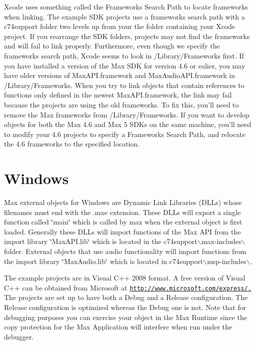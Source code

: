 Xcode uses something called the Frameworks Search Path to locate frameworks when linking. The example SDK projects use a frameworks search path with a c74support folder two levels up from your the folder containing your Xcode project. If you rearrange the SDK folders, projects may not find the frameworks and will fail to link properly. Furthermore, even though we specify the frameworks search path, Xcode seems to look in /Library/Frameworks first. If you have installed a version of the Max SDK for version 4.6 or ealier, you may have older versions of MaxAPI.framework and MaxAudioAPI.framework in /Library/Frameworks. When you try to link objects that contain references to functions only defined in the newest MaxAPI.framework, the link may fail because the projects are using the old frameworks. To fix this, you'll need to remove the Max frameworks from /Library/Frameworks. If you want to develop objects for both the Max 4.6 and Max 5 SDKs on the same machine, you'll need to modify your 4.6 projects to specify a Frameworks Search Path, and relocate the 4.6 frameworks to the specified location.\hypertarget{chapter_platform_chapter_platform_win}{}\section{Windows}\label{chapter_platform_chapter_platform_win}
Max external objects for Windows are Dynamic Link Libraries (DLLs) whose filenames must end with the .mxe extension. These DLLs will export a single function called \char`\"{}main\char`\"{} which is called by max when the external object is first loaded. Generally these DLLs will import functions of the Max API from the import library \char`\"{}MaxAPI.lib\char`\"{} which is located in the c74support$\backslash$max-\/includes$\backslash$ folder. External objects that use audio functionality will import functions from the import library \char`\"{}MaxAudio.lib\char`\"{} which is located in c74support$\backslash$msp-\/includes$\backslash$.

The example projects are in Visual C++ 2008 format. A free version of Visual C++ can be obtained from Microsoft at \href{http://www.microsoft.com/express/.}{\tt http://www.microsoft.com/express/.} The projects are set up to have both a Debug and a Release configuration. The Release configuration is optimized whereas the Debug one is not. Note that for debugging purposes you can exercise your object in the Max Runtime since the copy protection for the Max Application will interfere when run under the debugger.

